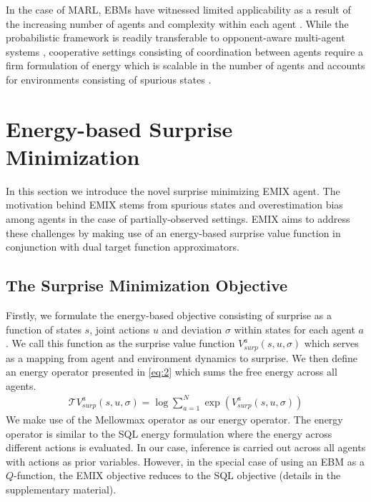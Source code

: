 \documentclass{article}
\begin{document}
\begin{multicols}{2}
In the case of MARL, EBMs have witnessed limited applicability as a result of the increasing number of agents and complexity within each agent \cite{overview}. While the probabilistic framework is readily transferable to opponent-aware multi-agent systems \cite{probabilistic}, cooperative settings consisting of coordination between agents require a firm formulation of energy which is scalable in the number of agents \cite{twoplayer} and accounts for environments consisting of spurious states \cite{marlsql}. 

\section{Energy-based Surprise Minimization}
In this section we introduce the novel surprise minimizing EMIX agent. The motivation behind EMIX stems from spurious states and overestimation bias among agents in the case of partially-observed settings. EMIX aims to address these challenges by making use of an energy-based surprise value function in conjunction with dual target function approximators. 

\subsection{The Surprise Minimization Objective}
Firstly, we formulate the energy-based objective consisting of surprise as a function of states $s$, joint actions $u$ and deviation $\sigma$ within states for each agent $a$. We call this function as the surprise value function $V_{surp}^{a}(s,u,\sigma)$ which serves as a mapping from agent and environment dynamics to surprise. We then define an energy operator presented in \autoref{eq:2} which sums the free energy across all agents. 
\begin{gather}
    \mathcal{T}V^{a}_{surp}(s,u,\sigma) = \log \sum_{a=1}^{N} \exp{(V^{a}_{surp}(s,u,\sigma))} \label{eq:2}
\end{gather}
We make use of the Mellowmax operator \cite{mellowmax} as our energy operator. The energy operator is similar to the SQL energy formulation \cite{sql} where the energy across different actions is evaluated. In our case, inference is carried out across all agents with actions as prior variables. However, in the special case of using an EBM as a $Q$-function, the EMIX objective reduces to the SQL objective (details in the supplementary material). 


\end{multicols}
\end{document}
